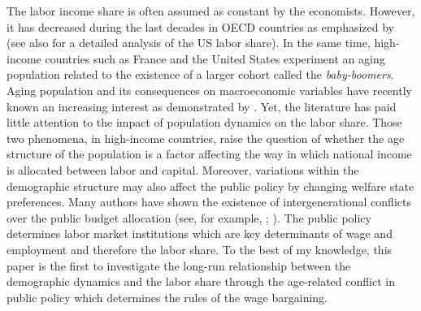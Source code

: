 

The labor income share is often assumed as constant by the economists. However, it has decreased during the last decades in OECD countries as emphasized by \cite{Karabarbounis2014} (see also \citealt{Elsby2013} for a detailed analysis of the US labor share).
In the same time, high-income countries such as France and the United States experiment an aging population related to the existence of a larger cohort called the \textit{baby-boomers}. Aging population and its consequences on macroeconomic variables have recently known an increasing interest as demonstrated by \cite{Sheiner2014}.
Yet, the literature has paid little attention to the impact of population dynamics on the labor share. Those two phenomena, in high-income countries, raise the question of whether the age structure of the population is a factor affecting the way in which national income is allocated between labor and capital.
Moreover, variations within the demographic structure may also affect the public policy by changing welfare state preferences. Many authors have shown the existence of intergenerational conflicts over the public budget allocation (see, for example, \citealt{Busemeyer2009}; \citealt{Sorensen2013}). The public policy determines labor market institutions which are key determinants of wage and employment and therefore the labor share.
To the best of my knowledge, this paper is the first to investigate the long-run relationship between the demographic dynamics and the labor share through the age-related conflict in public policy which determines the rules of the wage bargaining.


